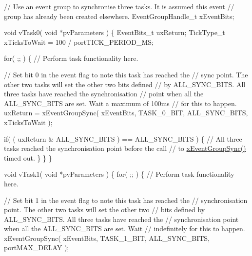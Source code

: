 \begin{DoxyPre}  // Use an event group to synchronise three tasks.  It is assumed this event
  // group has already been created elsewhere.
  EventGroupHandle\_t xEventBits;\end{DoxyPre}



\begin{DoxyPre}  void vTask0( void *pvParameters )
  \{
  EventBits\_t uxReturn;
  TickType\_t xTicksToWait = 100 / portTICK\_PERIOD\_MS;\end{DoxyPre}



\begin{DoxyPre}    for( ;; )
    \{
       // Perform task functionality here.\end{DoxyPre}



\begin{DoxyPre}       // Set bit 0 in the event flag to note this task has reached the
       // sync point.  The other two tasks will set the other two bits defined
       // by ALL\_SYNC\_BITS.  All three tasks have reached the synchronisation
       // point when all the ALL\_SYNC\_BITS are set.  Wait a maximum of 100ms
       // for this to happen.
       uxReturn = xEventGroupSync( xEventBits, TASK\_0\_BIT, ALL\_SYNC\_BITS, xTicksToWait );\end{DoxyPre}



\begin{DoxyPre}       if( ( uxReturn \& ALL\_SYNC\_BITS ) == ALL\_SYNC\_BITS )
       \{
           // All three tasks reached the synchronisation point before the call
           // to \hyperlink{externals_2freertos_2include_2event__groups_8h_a869511456b86426f52e2eec898bff341}{xEventGroupSync()} timed out.
       \}
   \}
  \}\end{DoxyPre}



\begin{DoxyPre}  void vTask1( void *pvParameters )
  \{
    for( ;; )
    \{
       // Perform task functionality here.\end{DoxyPre}



\begin{DoxyPre}       // Set bit 1 in the event flag to note this task has reached the
       // synchronisation point.  The other two tasks will set the other two
       // bits defined by ALL\_SYNC\_BITS.  All three tasks have reached the
       // synchronisation point when all the ALL\_SYNC\_BITS are set.  Wait
       // indefinitely for this to happen.
       xEventGroupSync( xEventBits, TASK\_1\_BIT, ALL\_SYNC\_BITS, portMAX\_DELAY );\end{DoxyPre}



